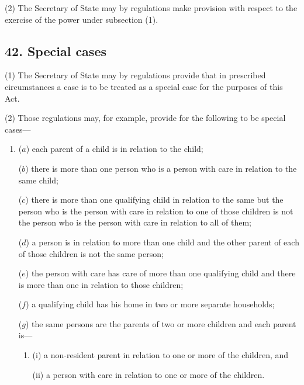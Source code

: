 \documentclass[a4paper]{article}
\begin{document}
(2)
The Secretary of State may by regulations make provision with respect to the exercise of the power under subsection (1).


\subsection{42. Special cases}

(1) The Secretary of State may by regulations provide that in prescribed 
circumstances a case is to be treated as a special case for the purposes of this Act.

(2)
Those regulations may, for example, provide for the following to be special cases---
\begin{enumerate}\item[]
($a$) each parent of a child is  in relation
to the child;

($b$) there is more than one person who is a person with care in relation to the
same child;

($c$) there is more than one qualifying child in relation to the same  but the person who is the person with care in
relation to one of those children is not the person who is the person with
care in relation to all of them;

($d$) a person is  in relation to more than
one child and the other parent of each of those children is not the same
person;

($e$) the person with care has care of more than one qualifying child and there
is more than one  in relation to those
children;

($f$) a qualifying child has his home in two or more separate households;

($g$) the same persons are the parents of two or more children and each parent is---
\begin{enumerate}\item[]
(i) a non-resident parent in relation to one or more of the children, and

(ii) a person with care in relation to one or more of the children.
\end{enumerate}
\end{enumerate}
\end{document}
